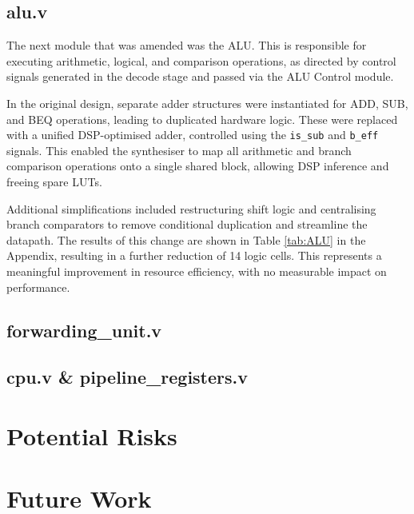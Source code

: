 \documentclass[a4paper,10pt]{article}
\begin{document}
\subsection{alu.v}
\label{sec:alu.v}

The next module that was amended was the ALU. 
This is responsible for executing arithmetic, logical, 
and comparison operations, as directed by control signals 
generated in the decode stage and passed via the ALU Control module.

In the original design, separate adder structures were instantiated for 
ADD, SUB, and BEQ operations, leading to duplicated hardware logic. 
These were replaced with a unified DSP-optimised adder, controlled using the 
\texttt{is\_sub} and \texttt{b\_eff} signals. 
This enabled the synthesiser to map all arithmetic and 
branch comparison operations onto a single shared block, 
allowing DSP inference and freeing spare LUTs.

Additional simplifications included restructuring shift logic 
and centralising branch comparators to remove conditional duplication 
and streamline the datapath. 
The results of this change are shown in 
Table \ref{tab:ALU} in the Appendix, 
resulting in a further reduction of 14 logic cells. 
This represents a meaningful improvement in resource efficiency, 
with no measurable impact on performance.

\subsection{forwarding\_unit.v}
\label{sec:forwarding_unit.v}

\subsection{cpu.v \& pipeline\_registers.v}
\label{sec:cpu.v_and_pipeline_registers.v}

\section{Potential Risks}
\label{sec:Potential_Risks}

\section{Future Work}
\label{sec:Future_Work}
\end{document}

